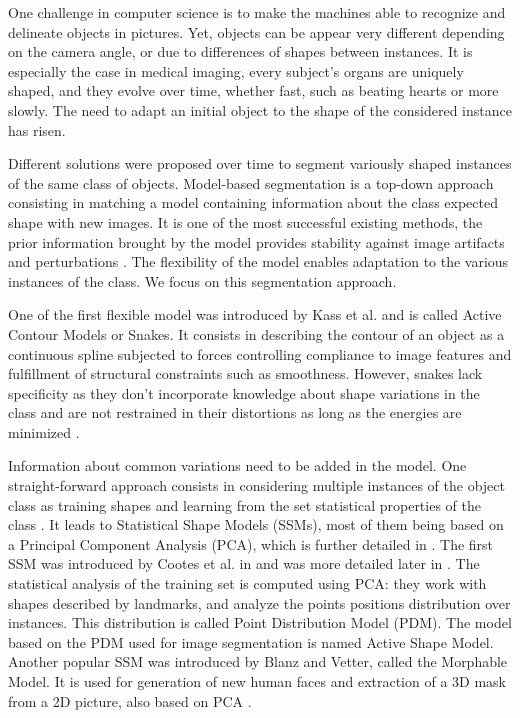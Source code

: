 One challenge in computer science is to make the machines able to recognize and delineate objects in pictures. Yet, objects can be appear very different depending on the camera angle, or due to differences of shapes between instances. It is especially the case in medical imaging, every subject's organs are uniquely shaped, and they evolve over time, whether fast, such as beating hearts or more slowly. The need to adapt an initial object to the shape of the considered instance has risen. 


Different solutions were proposed over time to segment variously shaped instances of the same class of objects. Model-based segmentation is a top-down approach consisting in matching a model containing information about the class expected shape with new images. It is one of the most successful existing methods, the prior information brought by the model provides stability against image artifacts and perturbations \cite{heimann_2009_statistical}. The flexibility of the model enables adaptation to the various instances of the class. We focus on this segmentation approach. 

One of the first flexible model was introduced by Kass et al. \cite{kass_1988_snakes} and is called Active Contour Models or Snakes. It consists in describing the contour of an object as a continuous spline subjected to forces controlling compliance to image features and fulfillment of structural constraints such as smoothness. However, snakes lack specificity as they don't incorporate knowledge about shape variations in the class and are not restrained in their distortions as long as the energies are minimized \cite{davies_2008_statistical}. 

Information about common variations need to be added in the model. One straight-forward approach consists in considering multiple instances of the object class as training shapes and learning from the set statistical properties of the class \cite{heimann_2009_statistical}. It leads to Statistical Shape Models (SSMs), most of them being based on a Principal Component Analysis (PCA), which is further detailed in . The first SSM was introduced by Cootes et al. in \cite{cootes_1994_use} and was more detailed later in \cite{cootes_1995_active}. The statistical analysis of the training set is computed using PCA: they work with shapes described by landmarks, and analyze the points positions distribution over instances. This distribution is called Point Distribution Model (PDM). The model based on the PDM used for image segmentation is named Active Shape Model. Another popular SSM was introduced by Blanz and Vetter, called the Morphable Model. It is used for generation of new human faces and extraction of a 3D mask from a 2D picture, also based on PCA \cite{blanz_1999_morphable}.

